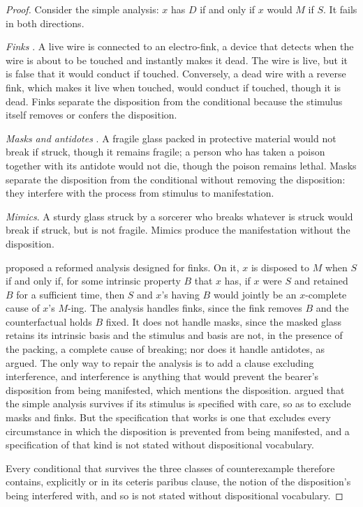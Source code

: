 \documentclass{situationist-preprint}
\begin{document}
\begin{proof}
Consider the simple analysis: $x$ has $D$ if and only if $x$ would $M$ if $S$. It fails in both directions.

\emph{Finks} \citep{Martin1994}. A live wire is connected to an electro-fink, a device that detects when the wire is about to be touched and instantly makes it dead. The wire is live, but it is false that it would conduct if touched. Conversely, a dead wire with a reverse fink, which makes it live when touched, would conduct if touched, though it is dead. Finks separate the disposition from the conditional because the stimulus itself removes or confers the disposition.

\emph{Masks and antidotes} \citep{Johnston1992,Bird1998}. A fragile glass packed in protective material would not break if struck, though it remains fragile; a person who has taken a poison together with its antidote would not die, though the poison remains lethal. Masks separate the disposition from the conditional without removing the disposition: they interfere with the process from stimulus to manifestation.

\emph{Mimics}. A sturdy glass struck by a sorcerer who breaks whatever is struck would break if struck, but is not fragile. Mimics produce the manifestation without the disposition.

\citet{Lewis1997} proposed a reformed analysis designed for finks. On it, $x$ is disposed to $M$ when $S$ if and only if, for some intrinsic property $B$ that $x$ has, if $x$ were $S$ and retained $B$ for a sufficient time, then $S$ and $x$'s having $B$ would jointly be an $x$-complete cause of $x$'s $M$-ing. The analysis handles finks, since the fink removes $B$ and the counterfactual holds $B$ fixed. It does not handle masks, since the masked glass retains its intrinsic basis and the stimulus and basis are not, in the presence of the packing, a complete cause of breaking; nor does it handle antidotes, as \citet{Bird1998} argued. The only way to repair the analysis is to add a clause excluding interference, and interference is anything that would prevent the bearer's disposition from being manifested, which mentions the disposition. \citet{Choi2006} argued that the simple analysis survives if its stimulus is specified with care, so as to exclude masks and finks. But the specification that works is one that excludes every circumstance in which the disposition is prevented from being manifested, and a specification of that kind is not stated without dispositional vocabulary.

Every conditional that survives the three classes of counterexample therefore contains, explicitly or in its ceteris paribus clause, the notion of the disposition's being interfered with, and so is not stated without dispositional vocabulary.
\end{proof}
\end{document}
